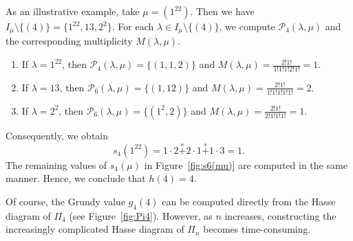 \documentclass[a4paper,11pt]{amsart}
\theoremstyle{definition}
\newcommand{\nimadd}{\overset{*}{+}}
\numberwithin{equation}{section}
\def\Par{\mathscr{P}}
\begin{document}
%
As an illustrative example, take $\mu=(1^22)$.
Then we have $I_{\mu}\setminus\{(4)\}=\{1^22,13,2^2\}$.
%
For each $\lambda\in I_{\mu}\setminus\{(4)\}$, we compute $\Par_{4}(\lambda,\mu)$ 
and the corresponding multiplicity $M(\lambda,\mu)$.
\begin{enumerate}[label=\alph*)]
%
\item
If $\lambda=1^22$, then $\Par_{4}(\lambda,\mu)=\{(1,1,2)\}$ and $M(\lambda,\mu)=\frac{2!1!}{1!1!1!2!1!}=1$.
%
\item
If $\lambda=13$, then $\Par_{6}(\lambda,\mu)=\{(1,12)\}$ and $M(\lambda,\mu)=\frac{2!1!}{1!1!1!1!1!}=2$.
%
\item
If $\lambda=2^2$, then $\Par_{6}(\lambda,\mu)=\{(1^2,2)\}$ and $M(\lambda,\mu)=\frac{2!1!}{2!1!1!1!}=1$.
%
\end{enumerate}
%
Consequently, we obtain
\[
s_{4}(1^22)=1\cdot2\nimadd 2\cdot1\nimadd 1\cdot3 =1.
\]
%
The remaining values of $s_{4}(\mu)$ in Figure~\ref{fig:s6(mu)} are computed in the same manner.
Hence, we conclude that $h(4)=4$.
%
\par
%
Of course, the Grundy value $g_{4}(4)$ can be computed directly from the Hasse diagram of $\Pi_{4}$
(see Figure~\ref{fig:Pi4}).
However, as $n$ increases, constructing the increasingly complicated Hasse diagram of $\Pi_{n}$ becomes time-consuming.
%
%
%
%

%
%
%
%
\appendix
%
\end{document}

